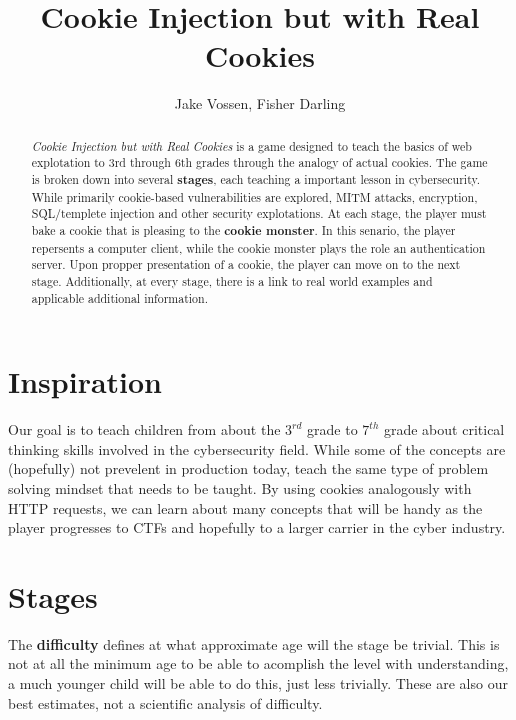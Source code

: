 \documentclass{article}
\begin{document}
\title{Cookie Injection but with Real Cookies}
\author{Jake Vossen, Fisher Darling}

\maketitle

\begin{abstract}
  
\textit{Cookie Injection but with Real Cookies} is a
game designed to teach the basics of web explotation to 3rd through
6th grades through the analogy of actual cookies. The game is broken
down into several \textbf{stages}, each teaching a important lesson in
cybersecurity. While primarily cookie-based vulnerabilities are
explored, MITM attacks, encryption, SQL/templete injection and other
security explotations. At each stage, the player must bake a cookie
that is pleasing to the \textbf{cookie monster}. In this senario, the
player repersents a computer client, while the cookie monster plays
the role an authentication server. Upon propper presentation of a
cookie, the player can move on to the next stage. Additionally, at
every stage, there is a link to real world examples and applicable
additional information.

\end{abstract}

\section{Inspiration}

Our goal is to teach children from about the $3^{rd}$ grade to
$7^{th}$ grade about critical thinking skills involved in the cybersecurity
field. While some of the concepts are (hopefully) not prevelent in
production today, teach the same type of problem solving mindset that
needs to be taught. By using cookies analogously with HTTP requests,
we can learn about many concepts that will be handy as the player
progresses to CTFs and hopefully to a larger carrier in the cyber
industry. 

\section{Stages}

The \textbf{difficulty} defines at what approximate age will the stage
be trivial. This is not at all the minimum age to be able to acomplish
the level with understanding, a much younger child will be able to do
this, just less trivially. These are also our best estimates, not a
scientific analysis of difficulty.
\end{document}
